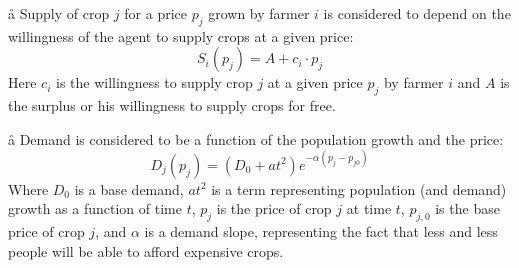 \begin{frame}{\aa}{\aac}
    Supply of crop $j$ for a price $p_j$ grown by farmer $i$ is considered to depend on the willingness of the agent to supply crops at a given price:
    \begin{equation}
      S_i(p_j) = A + c_i \cdot p_j
    \end{equation}
  Here $c_i$ is the willingness to supply crop $j$  at a given price $p_j$ by farmer $i$ and $A$ is the surplus or his willingness to supply crops for free.
\end{frame}

\begin{frame}{\aa}{\aac}
Demand is considered to be a function of the population growth and the price:
  \begin{equation}
    D_j(p_j) = \left( D_0 + at^2 \right) e^{-\alpha (p_j-p_{j0})}
  \end{equation}
Where $D_0$ is a base demand, $at^2$ is a term representing population (and demand) growth as a function of time $t$, $p_j$ is the price of crop $j$ at time $t$, $p_{j,0}$ is the base price of crop $j$, and $\alpha$ is a demand slope, representing the fact that less and less people will be able to afford expensive crops.
\end{frame}

